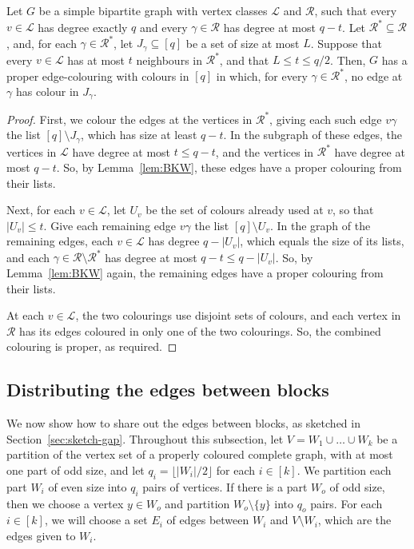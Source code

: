 \begin{lemma}\label{lem:twostage}
Let $G$ be a simple bipartite graph with vertex classes $\mathcal L$ and $\mathcal R$, such that every $v\in\mathcal L$ has degree exactly $q$ and every $\gamma\in\mathcal R$ has degree at most $q-t$. Let $\mathcal R^*\subseteq\mathcal R$, and, for each $\gamma\in\mathcal R^*$, let $J_\gamma\subseteq[q]$ be a set of size at most $L$. Suppose that every $v\in\mathcal L$ has at most $t$ neighbours in $\mathcal R^*$, and that $L\le t\le q/2$. Then, $G$ has a proper edge-colouring with colours in $[q]$ in which, for every $\gamma\in \mathcal R^*$, no edge at $\gamma$ has colour in $J_\gamma$.
\end{lemma}
\begin{proof}
First, we colour the edges at the vertices in $\mathcal R^*$, giving each such edge $v\gamma$ the list $[q]\setminus J_\gamma$, which has size at least $q-t$. In the subgraph of these edges, the vertices in $\mathcal L$ have degree at most $t\le q-t$, and the vertices in $\mathcal R^*$ have degree at most $q-t$. So, by Lemma~\ref{lem:BKW}, these edges have a proper colouring from their lists.

Next, for each $v\in \mathcal L$, let $U_v$ be the set of colours already used at $v$, so that $|U_v|\le t$. Give each remaining edge $v\gamma$ the list $[q]\setminus U_v$. In the graph of the remaining edges, each $v\in \mathcal L$ has degree $q-|U_v|$, which equals the size of its lists, and each $\gamma\in \mathcal R\setminus \mathcal R^*$ has degree at most $q-t\le q-|U_v|$. So, by Lemma~\ref{lem:BKW} again, the remaining edges have a proper colouring from their lists.

At each $v\in \mathcal L$, the two colourings use disjoint sets of colours, and each vertex in $\mathcal R$ has its edges coloured in only one of the two colourings. So, the combined colouring is proper, as required.
\end{proof}

\subsection{Distributing the edges between blocks}\label{sec:distribute}
We now show how to share out the edges between blocks, as sketched in Section~\ref{sec:sketch-gap}.
Throughout this subsection, let $V=W_1\cup\dots\cup W_k$ be a partition of the vertex set of a properly coloured complete graph, with at most one part of odd size, and let $q_i=\lfloor|W_i|/2\rfloor$ for each $i\in [k]$.
We partition each part $W_i$ of even size into $q_i$ pairs of vertices. If there is a part $W_o$ of odd size, then we choose a vertex $y\in W_o$ and partition $W_o\setminus\{y\}$ into $q_o$ pairs.
For each $i\in [k]$, we will choose a set $E_i$ of edges between $W_i$ and $V\setminus W_i$, which are the edges given to $W_i$.

